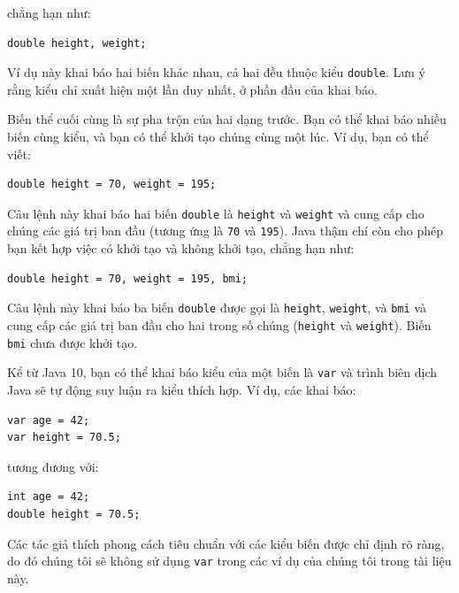 chẳng hạn như:

\begin{verbatim}
double height, weight;
\end{verbatim}

Ví dụ này khai báo hai biến khác nhau, cả hai đều thuộc kiểu
\texttt{double}. Lưu ý rằng kiểu chỉ xuất hiện một lần duy nhất, ở phần
đầu của khai báo.

Biến thể cuối cùng là sự pha trộn của hai dạng trước. Bạn có thể khai
báo nhiều biến cùng kiểu, và bạn có thể khởi tạo chúng cùng một lúc. Ví
dụ, bạn có thể viết:

\begin{verbatim}
double height = 70, weight = 195;
\end{verbatim}

Câu lệnh này khai báo hai biến \texttt{double} là \texttt{height} và
\texttt{weight} và cung cấp cho chúng các giá trị ban đầu (tương ứng là
\texttt{70} và \texttt{195}). Java thậm chí còn cho phép bạn kết hợp
việc có khởi tạo và không khởi tạo, chẳng hạn như:

\begin{verbatim}
double height = 70, weight = 195, bmi;
\end{verbatim}

Câu lệnh này khai báo ba biến \texttt{double} được gọi là
\texttt{height}, \texttt{weight}, và \texttt{bmi} và cung cấp các giá
trị ban đầu cho hai trong số chúng (\texttt{height} và \texttt{weight}).
Biến \texttt{bmi} chưa được khởi tạo.

Kể từ Java 10, bạn có thể khai báo kiểu của một biến là \texttt{var} và
trình biên dịch Java sẽ tự động suy luận ra kiểu thích hợp. Ví dụ, các
khai báo:

\begin{verbatim}
var age = 42;
var height = 70.5;
\end{verbatim}

tương đương với:

\begin{verbatim}
int age = 42;
double height = 70.5;
\end{verbatim}

Các tác giả thích phong cách tiêu chuẩn với các kiểu biến được chỉ định
rõ ràng, do đó chúng tôi sẽ không sử dụng \texttt{var} trong các ví dụ
của chúng tôi trong tài liệu này.


